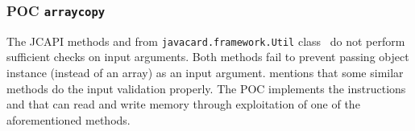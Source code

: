 \documentclass{../llncs/llncs}
\begin{document}

\subsubsection{POC \texttt{arraycopy}}\label{subsec:arraycopy-explanation}
The JCAPI methods \arrayCopy and \arrayCopyNonAtomic from \texttt{javacard.framework.Util} class~\cite{jcspecs31download} do not perform sufficient checks on input arguments. Both methods fail to prevent passing object instance (instead of an array) as an input argument. \cite{se:oracle:part1} mentions that some similar methods do the input validation properly. The POC implements the instructions \readmem and \writemem that can read and write memory through exploitation of one of the aforementioned methods.


\end{document}
